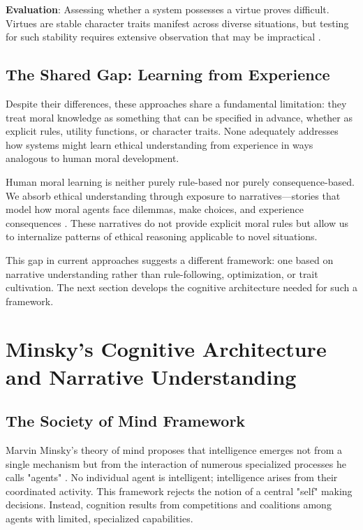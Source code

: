 \documentclass[12pt]{article}
\begin{document}
\textbf{Evaluation}: Assessing whether a system possesses a virtue proves difficult. Virtues are stable character traits manifest across diverse situations, but testing for such stability requires extensive observation that may be impractical \citep{anderson2011machine}.

\subsection{The Shared Gap: Learning from Experience}

Despite their differences, these approaches share a fundamental limitation: they treat moral knowledge as something that can be specified in advance, whether as explicit rules, utility functions, or character traits. None adequately addresses how systems might learn ethical understanding from experience in ways analogous to human moral development.

Human moral learning is neither purely rule-based nor purely consequence-based. We absorb ethical understanding through exposure to narratives—stories that model how moral agents face dilemmas, make choices, and experience consequences \citep{johnson1993moral, nussbaum1990love}. These narratives do not provide explicit moral rules but allow us to internalize patterns of ethical reasoning applicable to novel situations.

This gap in current approaches suggests a different framework: one based on narrative understanding rather than rule-following, optimization, or trait cultivation. The next section develops the cognitive architecture needed for such a framework.

\section{Minsky's Cognitive Architecture and Narrative Understanding}

\subsection{The Society of Mind Framework}

Marvin Minsky's theory of mind proposes that intelligence emerges not from a single mechanism but from the interaction of numerous specialized processes he calls "agents" \citep{minsky1986society}. No individual agent is intelligent; intelligence arises from their coordinated activity. This framework rejects the notion of a central "self" making decisions. Instead, cognition results from competitions and coalitions among agents with limited, specialized capabilities.
\end{document}
